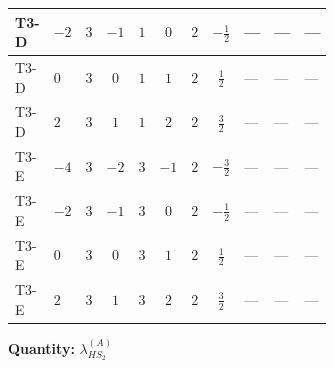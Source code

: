 \documentclass[8pt]{article}
\begin{document}
\begin{landscape}
\begin{longtable}{@{}llcccccc >{\raggedright\arraybackslash}p{0.21\linewidth} >{\raggedright\arraybackslash}p{0.21\linewidth} >{\raggedright\arraybackslash}p{0.21\linewidth}@{}}
\midrule
T3-D & $-2$ & $3$ & $-1$ & $1$ & $0$ & $2$ & $-\frac{1}{2}$ & --- & --- & --- \\
\midrule
T3-D & $0$ & $3$ & $0$ & $1$ & $1$ & $2$ & $\frac{1}{2}$ & --- & --- & --- \\
\midrule
T3-D & $2$ & $3$ & $1$ & $1$ & $2$ & $2$ & $\frac{3}{2}$ & --- & --- & --- \\
\midrule
T3-E & $-4$ & $3$ & $-2$ & $3$ & $-1$ & $2$ & $-\frac{3}{2}$ & --- & --- & --- \\
\midrule
T3-E & $-2$ & $3$ & $-1$ & $3$ & $0$ & $2$ & $-\frac{1}{2}$ & --- & --- & --- \\
\midrule
T3-E & $0$ & $3$ & $0$ & $3$ & $1$ & $2$ & $\frac{1}{2}$ & --- & --- & --- \\
\midrule
T3-E & $2$ & $3$ & $1$ & $3$ & $2$ & $2$ & $\frac{3}{2}$ & --- & --- & --- \\
\midrule
\bottomrule
\end{longtable}
\clearpage
\noindent\textbf{Quantity: }$\lambda_{HS_2}^{(A)}$\par\smallskip

\end{landscape}
\end{document}
